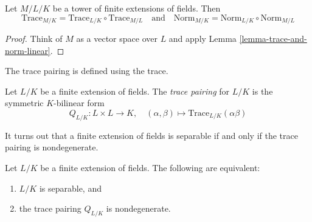 \begin{lemma}
\label{lemma-trace-and-norm-tower}
Let $M/L/K$ be a tower of finite extensions of fields. Then
$$
\text{Trace}_{M/K} = \text{Trace}_{L/K} \circ \text{Trace}_{M/L}
\quad\text{and}\quad
\text{Norm}_{M/K} = \text{Norm}_{L/K} \circ \text{Norm}_{M/L}
$$
\end{lemma}

\begin{proof}
Think of $M$ as a vector space over $L$ and apply
Lemma \ref{lemma-trace-and-norm-linear}.
\end{proof}

\noindent
The trace pairing is defined using the trace.

\begin{definition}
\label{definition-trace-pairing}
Let $L/K$ be a finite extension of fields. The {\it trace pairing}
for $L/K$ is the symmetric $K$-bilinear form
$$
Q_{L/K} : L \times L \longrightarrow K,\quad
(\alpha, \beta) \longmapsto \text{Trace}_{L/K}(\alpha\beta)
$$
\end{definition}

\noindent
It turns out that a finite extension of fields is separable if and only
if the trace pairing is nondegenerate.

\begin{lemma}
\label{lemma-separable-trace-pairing}
Let $L/K$ be a finite extension of fields. The following are equivalent:
\begin{enumerate}
\item $L/K$ is separable, and
\item the trace pairing $Q_{L/K}$ is nondegenerate.
\end{enumerate}
\end{lemma}

